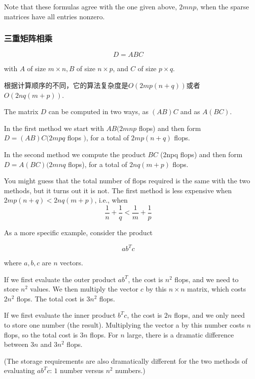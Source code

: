 \begin{remark}
    Note that these formulas agree with the one given above, $ 2 m n p $, when the sparse matrices have all entries nonzero.
\end{remark}

\subsubsection{三重矩阵相乘}

\begin{theorem}
    \begin{equation} D=A B C \end{equation}

with $ A $ of size $ m \times n, B $ of size $ n \times p $, and $ C $ of size $ p \times q $. 

    根据计算顺序的不同，它的算法复杂度是$O( 2 m p(n+q) )$或者$O(2 n q(m+p) )$.
\end{theorem}



The matrix $ D $ can be computed in two ways, as $ (A B) C $ and as $ A(B C) $. 

In the first method we start with $ A B(2 m n p $ flops) and then form $ D=(A B) C(2 m p q $ flops $ ) $, for a total of $ 2 m p(n+q) $ flops. 

In the second method we compute the product $ B C $ (2npq flops) and then form $ D=A(B C)(2 m n q $ flops), for a total of $ 2 n q(m+p) $ flops.

\begin{remark}
    You might guess that the total number of flops required is the same with the two methods, but it turns out it is not. The first method is less expensive when $ 2 m p(n+q)<2 n q(m+p) $, i.e., when
\begin{equation}
\frac{1}{n}+\frac{1}{q}<\frac{1}{m}+\frac{1}{p}
\end{equation}
\end{remark}

\begin{example}
    As a more specific example, consider the product 
    
    \begin{equation} a b^{T} c \end{equation}
    
    where $ a, b, c $ are $ n $ vectors. 
    
    If we first evaluate the outer product $ a b^{T} $, the cost is $ n^{2} $ flops, and we need to store $ n^{2} $ values. We then multiply the vector $ c $ by this $ n \times n $ matrix, which costs $ 2 n^{2} $ flops. The total cost is $ 3 n^{2} $ flops.

    If we first evaluate the inner product $b^Tc$, the cost is $2n$ flops, and we only need to store one number (the result). Multiplying the vector a by this number costs $n$ flops, so the total cost is $3n$ flops. For $n$ large, there is a dramatic difference between $3n$ and $3n^2$ flops.

    (The storage requirements are also dramatically different for the two methods of evaluating $ab^Tc$: $1$ number versus $n^2$ numbers.)
\end{example}

